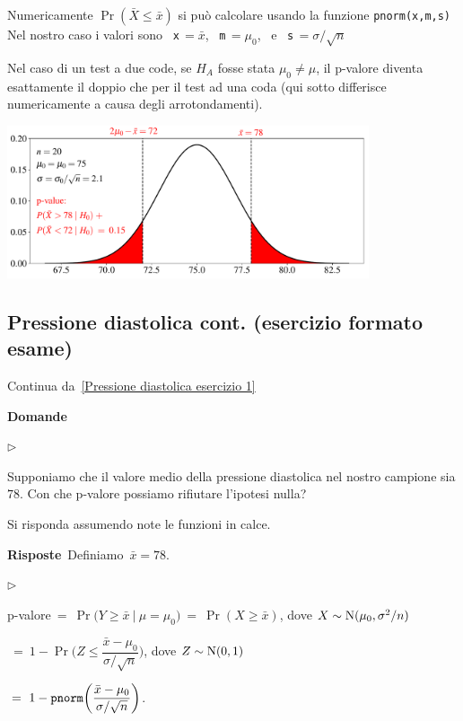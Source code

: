 \documentclass[11pt,openany]{book}
\newcommand{\mylabel}[1]{{\footnotesize\textsf{#1}}\hfill}
\renewenvironment{itemize}
  {\begin{list}{$\triangleright$}{%
   \setlength{\parskip}{0mm}
   \setlength{\topsep}{.2\baselineskip}
   \setlength{\rightmargin}{0mm}
   \setlength{\listparindent}{0mm}
   \setlength{\itemindent}{0mm}
   \setlength{\labelwidth}{3ex}
   \setlength{\itemsep}{.4\baselineskip}
   \setlength{\parsep}{0mm}
   \setlength{\partopsep}{0mm}
   \setlength{\labelsep}{1ex}
   \setlength{\leftmargin}{\labelwidth+\labelsep}
   \let\makelabel\mylabel}}{%
   \end{list}\vspace*{-1.3mm}}
\begin{document}
Numericamente $\Pr(\bar X\le \bar x)$ si può calcolare usando la funzione {\tt pnorm(x,m,s)} Nel nostro caso i valori sono \ {\tt x}$\,=\bar x$,  \ {\tt m}$\,=\mu_0$, \ e  \ {\tt s}$\,=\sigma/\sqrt{n}$

Nel caso di un test a due code, se $H_A$ fosse stata $\mu_0\neq\mu$, il p-valore diventa esattamente il doppio che per il test ad una coda (qui sotto differisce numericamente a causa degli arrotondamenti). 

\hfil\includegraphics[width=0.8\textwidth]{figure/Z-test-p-val_02.pdf}


\clearpage\subsection{Pressione diastolica cont. (esercizio formato esame)}
\label{Pressione diastolica esercizio 2}

Continua da~\ref{Pressione diastolica esercizio 1}

\textbf{Domande}

\begin{itemize}
\item[6.] Supponiamo che il valore medio della pressione diastolica nel nostro campione sia $78$. 
Con che p-valore possiamo rifiutare l'ipotesi nulla?
\end{itemize}
Si risponda assumendo note le funzioni in calce.

\textbf{Risposte}\  Definiamo\ $\bar x=78$.\medskip

\begin{itemize}
\item[6.] 

p-valore$\ =\ \Pr\big(Y\ge \bar x\ \mathbin\big|\ \mu=\mu_0\big)\ =\ \Pr(X\ge\bar x)$, dove $X\sim {\rm N}(\mu_0,\sigma^2/n)$\medskip\smallskip

\phantom{p-valore}$\ =\ 1-\Pr\bigg(Z\le \dfrac{\bar x-\mu_0}{\sigma/\sqrt n}\bigg)$, dove $Z\sim {\rm N}(0,1)$\medskip

\phantom{p-valore}$\ =\ 1- {\tt pnorm}\bigg(\dfrac{\bar x-\mu_0}{\sigma/\sqrt n}\bigg)$.

\end{itemize}
\end{document}
